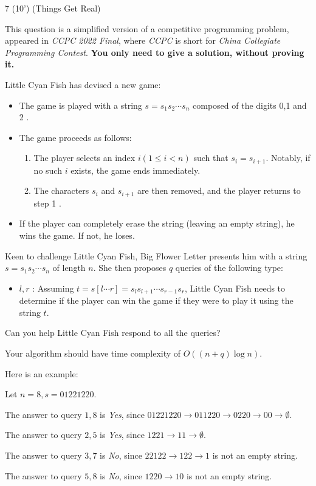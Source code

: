     \begin{question}{7 (10') (Things Get Real)}
    
    This question is a simplified version of a competitive programming problem, appeared in \textit{CCPC 2022 Final}, where \textit{CCPC} is short for \textit{China Collegiate Programming Contest}. \textbf{You only need to give a solution, without proving it. }

    Little Cyan Fish has devised a new game:
    \begin{itemize}
        \item The game is played with a string $s=s_1 s_2 \cdots s_n$ composed of the digits 0,1 and 2 .
        \item The game proceeds as follows:
        \begin{enumerate}
            \item The player selects an index $i(1 \leq i<n)$ such that $s_i=s_{i+1}$. Notably, if no such $i$ exists, the game ends immediately.
            \item  The characters $s_i$ and $s_{i+1}$ are then removed, and the player returns to step 1 .
        \end{enumerate}
        \item If the player can completely erase the string (leaving an empty string), he wins the game. If not, he loses.
    \end{itemize}

Keen to challenge Little Cyan Fish, Big Flower Letter presents him with a string $s=s_1 s_2 \cdots s_n$ of length $n$. She then proposes $q$ queries of the following type:

\begin{itemize}
    \item $l, r$ : Assuming $t=s[l \cdots r]=s_l s_{l+1} \cdots s_{r-1} s_r$, Little Cyan Fish needs to determine if the player can win the game if they were to play it using the string $t$.
\end{itemize}

Can you help Little Cyan Fish respond to all the queries?

Your algorithm should have  time complexity of $O((n+ q) \log n)$.



Here is an example: 

Let $n = 8, s = 01221220$. 


The answer to query $1, 8$ is \textit{Yes}, since $01221220 \to 011220 \to 0220 \to 00 \to \emptyset$.

The answer to query $2, 5$ is \textit{Yes}, since $1221 \to 11 \to \emptyset$.

The answer to query $3, 7$ is \textit{No}, since $22122 \to 122 \to 1$ is not an empty string. 

The answer to query $5, 8$ is \textit{No}, since $1220 \to 10$ is not an empty string. 
\end{question}